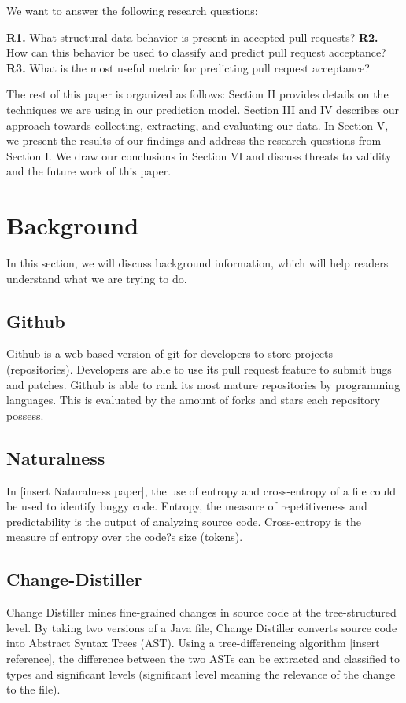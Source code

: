 \documentclass[10pt, conference]{IEEEtran}
\begin{document}
We want to answer the following research questions:
\begin{mdframed} 
\textbf{R1.} What structural data behavior is present in accepted pull requests?
\newline \textbf{R2.} How can this behavior be used to classify and predict pull request acceptance?
\newline \textbf{R3.} What is the most useful metric for predicting pull request acceptance?
\end{mdframed}

The rest of this paper is organized as follows: 
Section II provides details on the techniques we are using in our prediction model. Section III and IV describes our approach towards collecting, extracting, and evaluating our data. In Section V, we present the results of our findings and address the research questions from Section I. We draw our conclusions in Section VI and discuss threats to validity and the future work of this paper.

\section{Background}
In this section, we will discuss background information, which will help readers understand what we are trying to do.

\subsection{Github}
Github is a web-based version of git for developers to store projects (repositories). Developers are able to use its pull request feature to submit bugs and patches. Github is able to rank its most mature repositories by programming languages. This is evaluated by the amount of forks and stars each repository possess. 


\subsection{Naturalness}
In [insert Naturalness paper], the use of entropy and cross-entropy of a file could be used to identify buggy code. Entropy, the measure of repetitiveness and predictability is the output of analyzing source code. Cross-entropy is the measure of entropy over the code?s size (tokens).

\subsection{Change-Distiller}
Change Distiller mines fine-grained changes in source code at the tree-structured level. By taking two versions of a Java file, Change Distiller converts source code into Abstract Syntax Trees (AST). Using a tree-differencing algorithm [insert reference], the difference between the two ASTs can be extracted and classified to types and significant levels (significant level meaning the relevance of the change to the file). 
\end{document}

